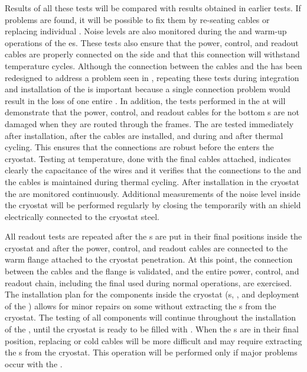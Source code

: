 Results of all these tests will be compared with results obtained 
in earlier  tests.  If problems are found, it will be possible 
to fix them by re-seating cables or replacing individual .
Noise levels are also monitored during the \cooldown and warm-up 
operations of the \coldbox{}es. These tests also ensure that the power,
control, and readout cables are properly connected
on the  side and that this connection will withstand temperature 
cycles. 
Although the connection between the cables and the 
has been redesigned to address a problem %
seen in , repeating these tests during integration
and installation of the  is important because a single connection problem would
result in the loss of one entire . 
In addition, the tests 
performed in the \coldbox at  will demonstrate that the power, control, and
readout cables for the bottom s are not damaged when they are routed 
through the  frames. 
The  are tested immediately after installation, after the cables are installed, and during and after thermal cycling. This ensures that the connections are robust before the  enters the cryostat.  Testing at  temperature, done with the final cables attached, indicates clearly the capacitance of the wires and it verifies that the connections to the  and the cables is maintained during thermal cycling.  After installation in the cryostat the  are monitored continuously. 
%
Additional measurements of the noise
level inside the cryostat will be performed regularly by closing 
the  temporarily with an  shield electrically connected 
to the cryostat steel. 

All readout tests are repeated after the s are put
in their final positions inside the cryostat and after the power, control, and
readout cables are connected to the warm flange attached to the cryostat
penetration. At this point, the connection between the cables and the flange
is validated, and the entire power, control, and readout chain, including the
final  used during normal operations, are exercised. The
installation plan for the  components inside the cryostat (s,
, and deployment of the ) allows for minor repairs on some  without extracting
the s from the cryostat. The testing of all  components
will continue throughout the installation of %
the , 
until the cryostat is ready to be filled with .  When the 
s are in their final position, replacing  
or cold cables will be more difficult and may require extracting the s 
from the cryostat. This operation will be performed only if major problems occur with the .

